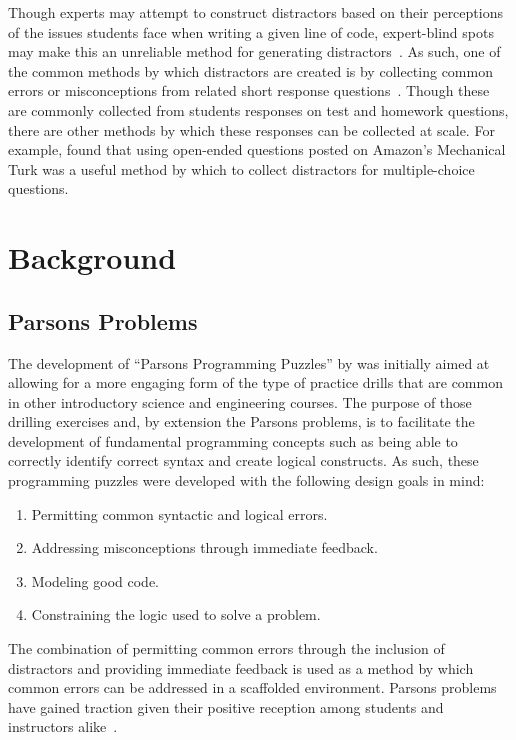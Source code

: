 \documentclass[authorversion,nonacm]{acmart}
\begin{document}
Though experts may attempt to construct distractors based on their perceptions
of the issues students face when writing a given line of code, expert-blind
spots may make this an unreliable method for generating
distractors~\cite{nathan2001expert}. As such, one of the common methods by
which distractors are created is by collecting common errors or misconceptions
from related short response questions~\cite{briggs2006diagnostic,
halloun1985initial}. Though these are commonly collected from students
responses on test and homework questions, there are other methods by which
these responses can be collected at scale.  For example,
\citet{scheponik2019investigating} found that using open-ended questions posted
on Amazon's Mechanical Turk was a useful method by which to collect distractors
for multiple-choice questions. 

\section{Background}

\subsection{Parsons Problems}

The development of ``Parsons Programming Puzzles'' by \citet{parsons2006parson}
was initially aimed at allowing for a more engaging form of the type of
practice drills that are common in other introductory science and engineering
courses. The purpose of those drilling exercises and, by extension the Parsons
problems, is to facilitate the development of fundamental programming concepts
such as being able to correctly identify correct syntax and create logical
constructs.  As such, these programming puzzles were developed with the
following design goals in mind:
\begin{enumerate}
    \item Permitting common syntactic and logical errors.
    \item Addressing misconceptions through immediate feedback.
    \item Modeling good code.
    \item Constraining the logic used to solve a problem.
\end{enumerate}
The combination of permitting common errors through the inclusion of
distractors and providing immediate feedback is used as a method by which
common errors can be addressed in a scaffolded environment.  Parsons problems
have gained traction given their positive reception among students and
instructors alike~\cite{ericson2015analysis, ericson2016identifying}.
\end{document}
